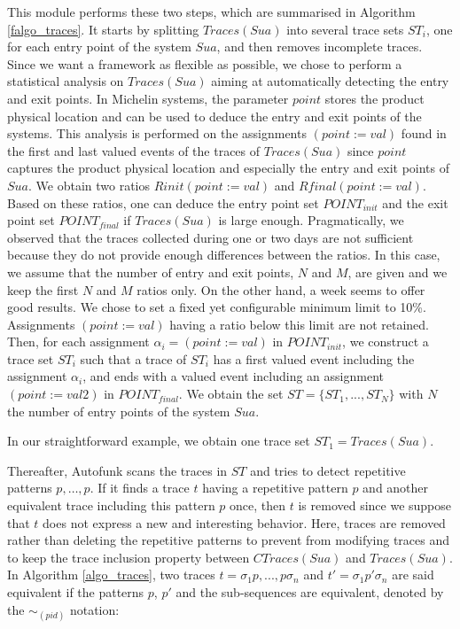 This module performs these two steps, which are summarised in
Algorithm \ref{falgo_traces}. It starts by splitting $Traces(Sua)$
into several trace sets $ST_i$, one for each entry point of the
system $\mathit{Sua}$, and then removes incomplete traces. Since
we want a framework as flexible as possible, we chose to perform
a statistical analysis on $Traces(Sua)$ aiming at automatically
detecting the entry and exit points.  In Michelin systems, the
parameter $point$ stores the product physical location and can be
used to deduce the entry and exit points of the systems.
This analysis is performed on the assignments $(point:=val)$
found in the first and last valued events of the traces of
$Traces(Sua)$ since $point$ captures the product physical
location and especially the entry and exit points of $\mathit{Sua}$.
We obtain two ratios $Rinit(point:=val)$ and
$Rfinal(point:=val)$.  Based on these ratios, one can deduce the
entry point set $POINT_{init}$ and the exit point set
$POINT_{final}$ if $Traces(Sua)$ is large enough. Pragmatically,
we observed that the traces collected during one or two days are
not sufficient because they do not provide enough differences
between the ratios. In this case, we assume that the number of
entry and exit points, $N$ and $M$, are given and we keep the
first $N$ and $M$ ratios only. On the other hand, a week seems to
offer good results. We chose to set a fixed yet configurable
minimum limit to 10\%. Assignments $(point:=val)$ having a ratio
below this limit are not retained. Then, for each assignment
$\alpha_i=(point:=val)$ in $POINT_{init}$, we construct a trace
set $ST_i$ such that a trace of $ST_i$ has a first valued event
including the assignment $\alpha_i$, and ends with a valued event
including an assignment $(point:=val2)$ in $POINT_{final}$. We
obtain the set $ST=\{ST_1,...,ST_N\}$ with $N$ the number of
entry points of the system $\mathit{Sua}$.

In our straightforward example, we obtain one trace set
$ST_1=Traces(Sua)$.

Thereafter, Autofunk scans the traces in $ST$ and tries to detect
repetitive patterns $p,\dots,p$. If it finds a trace $t$ having a
repetitive pattern $p$ and another equivalent trace including
this pattern $p$ once, then $t$ is removed since we suppose that
$t$ does not express a new and interesting behavior. Here, traces
are removed rather than deleting the repetitive patterns to
prevent from modifying traces and to keep the trace inclusion
property between $CTraces(Sua)$ and $Traces(Sua)$.
In Algorithm \ref{algo_traces}, two traces $t=\sigma_1 p,...,p
\sigma_n$ and $t'=\sigma_1 p' \sigma_n$ are said equivalent if
the patterns $p$, $p'$ and the sub-sequences are equivalent,
denoted by the $\sim_{(pid)}$ notation:

